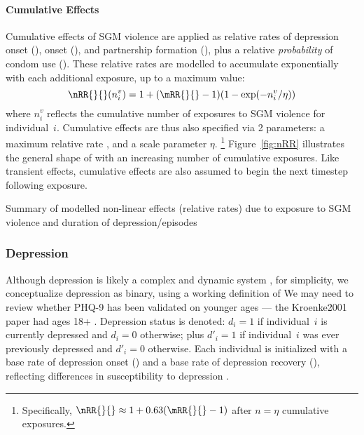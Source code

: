 \paragraph{Cumulative Effects}
Cumulative effects of SGM violence are applied as relative rates of
depression onset (),
\hazdrink onset (), and
partnership formation (), plus
a relative \emph{probability} of condom use ().
These relative rates are modelled to accumulate exponentially
with each additional exposure, up to a maximum value:
\begin{equation}\label{eq:nRR}
  \nRR{}{}(n^v_i) = 1+(\mRR{}{}-1)(1-\exp(-n^v_i/\eta))
\end{equation}
where $n^v_i$ reflects the cumulative number of
exposures to SGM violence for individual~$i$.
Cumulative effects are thus also specified via 2 parameters:
a maximum relative rate \mRR{}{}, and a scale parameter $\eta$.%
\footnote{Specifically, $\nRR{}{} \approx 1 + 0.63 (\mRR{}{}-1)$
  after $n = \eta$ cumulative exposures.}
Figure~\ref{fig:nRR} illustrates the general shape of \nRR{}{}
with an increasing number of cumulative exposures.
Like transient effects, cumulative effects are also assumed
to begin the next timestep following exposure.
\begin{table}
  \caption{Summary of modelled non-linear effects (relative rates) due to
    exposure to SGM violence and
    duration of depression/\hazdrink episodes}
  \label{tab:xrr}
  \centering
\end{table}
\subsubsection{Depression}\label{mod.par.evt.dep}
Although depression is likely a complex and dynamic system \cite{Cramer2016},
for simplicity, we conceptualize depression as binary,
using a working definition of
     {We may need to review whether PHQ-9 has been validated on younger ages
      --- the Kroenke2001 paper had ages 18+}
\cite{Kroenke2001}.
Depression status is denoted:
$d_i = 1$ if individual~$i$ is currently depressed and $d_i = 0$ otherwise; plus
$d'_i = 1$ if individual~$i$ was ever previously depressed and $d'_i = 0$ otherwise.
Each individual is initialized with
a base rate of depression onset () and
a base rate of depression recovery (\Ri{\d}),
reflecting differences in susceptibility to depression \cite{Hankin2015}.
